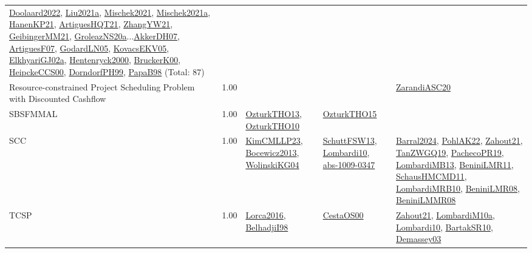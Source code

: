 {\begin{longtable}{p{3cm}r>{\raggedright\arraybackslash}p{6cm}>{\raggedright\arraybackslash}p{6cm}>{\raggedright\arraybackslash}p{8cm}}
\hyperref[detail:Doolaard2022]{Doolaard2022}, \hyperref[detail:Liu2021a]{Liu2021a}, \hyperref[detail:Mischek2021]{Mischek2021}, \hyperref[detail:Mischek2021a]{Mischek2021a}, \hyperref[detail:HanenKP21]{HanenKP21}, \hyperref[detail:ArtiguesHQT21]{ArtiguesHQT21}, \hyperref[detail:ZhangYW21]{ZhangYW21}, \hyperref[detail:GeibingerMM21]{GeibingerMM21}, \hyperref[detail:GroleazNS20a]{GroleazNS20a}...\hyperref[detail:AkkerDH07]{AkkerDH07}, \hyperref[detail:ArtiguesF07]{ArtiguesF07}, \hyperref[detail:GodardLN05]{GodardLN05}, \hyperref[detail:KovacsEKV05]{KovacsEKV05}, \hyperref[detail:ElkhyariGJ02a]{ElkhyariGJ02a}, \hyperref[detail:Hentenryck2000]{Hentenryck2000}, \hyperref[detail:BruckerK00]{BruckerK00}, \hyperref[detail:HeipckeCCS00]{HeipckeCCS00}, \hyperref[detail:DorndorfPH99]{DorndorfPH99}, \hyperref[detail:PapaB98]{PapaB98} (Total: 87)\\
\index{Resource-constrained Project Scheduling Problem with Discounted Cashflow}\index{Classification!Resource-constrained Project Scheduling Problem with Discounted Cashflow}Resource-constrained Project Scheduling Problem with Discounted Cashflow &  1.00 &  &  & \hyperref[detail:ZarandiASC20]{ZarandiASC20}\\
\index{SBSFMMAL}\index{Classification!SBSFMMAL}SBSFMMAL &  1.00 & \hyperref[detail:OzturkTHO13]{OzturkTHO13}, \hyperref[detail:OzturkTHO10]{OzturkTHO10} & \hyperref[detail:OzturkTHO15]{OzturkTHO15} & \\
\index{SCC}\index{Classification!SCC}SCC &  1.00 & \hyperref[detail:KimCMLLP23]{KimCMLLP23}, \hyperref[detail:Bocewicz2013]{Bocewicz2013}, \hyperref[detail:WolinskiKG04]{WolinskiKG04} & \hyperref[detail:SchuttFSW13]{SchuttFSW13}, \hyperref[detail:Lombardi10]{Lombardi10}, \hyperref[detail:abs-1009-0347]{abs-1009-0347} & \hyperref[detail:Barral2024]{Barral2024}, \hyperref[detail:PohlAK22]{PohlAK22}, \hyperref[detail:Zahout21]{Zahout21}, \hyperref[detail:TanZWGQ19]{TanZWGQ19}, \hyperref[detail:PachecoPR19]{PachecoPR19}, \hyperref[detail:LombardiMB13]{LombardiMB13}, \hyperref[detail:BeniniLMR11]{BeniniLMR11}, \hyperref[detail:SchausHMCMD11]{SchausHMCMD11}, \hyperref[detail:LombardiMRB10]{LombardiMRB10}, \hyperref[detail:BeniniLMR08]{BeniniLMR08}, \hyperref[detail:BeniniLMMR08]{BeniniLMMR08}\\
\index{TCSP}\index{Classification!TCSP}TCSP &  1.00 & \hyperref[detail:Lorca2016]{Lorca2016}, \hyperref[detail:BelhadjiI98]{BelhadjiI98} & \hyperref[detail:CestaOS00]{CestaOS00} & \hyperref[detail:Zahout21]{Zahout21}, \hyperref[detail:LombardiM10a]{LombardiM10a}, \hyperref[detail:Lombardi10]{Lombardi10}, \hyperref[detail:BartakSR10]{BartakSR10}, \hyperref[detail:Demassey03]{Demassey03}\\

\end{longtable}}
